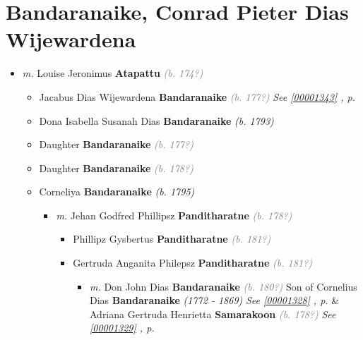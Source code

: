 \documentclass[10pt, openany]{book}
\begin{document}
\chapter{Bandaranaike, Conrad Pieter Dias Wijewardena}
\label{00001322}
\textcolor{slmaroon}{\textit{}}
\begin{itemize}
\item{\textit{m.} Louise Jeronimus \textbf{Atapattu} \textcolor{gray}{\textit{(b. 174?)}}   \label{couple:00001322:00001323} \begin{itemize}
\item{Jacabus Dias Wijewardena \textbf{Bandaranaike} \textcolor{gray}{\textit{(b. 177?)}} \textcolor{slteal}{\textit{See  \autoref{00001343} \textit{, p. \pageref{00001343} }}}}
\item{Dona Isabella Susanah Dias \textbf{Bandaranaike} \textcolor{slorange}{\textit{(b. 1793)}}
    }
\item{Daughter \textbf{Bandaranaike} \textcolor{gray}{\textit{(b. 177?)}}
 }
\item{Daughter \textbf{Bandaranaike} \textcolor{gray}{\textit{(b. 178?)}}
 }
\item{Corneliya \textbf{Bandaranaike} \textcolor{slorange}{\textit{(b. 1795)}}
\begin{itemize}
\item{\textit{m.} Jehan Godfred Phillipsz \textbf{Panditharatne} \textcolor{gray}{\textit{(b. 178?)}}   \label{couple:00002019:00002020} \begin{itemize}
\item{Phillipz Gysbertus \textbf{Panditharatne} \textcolor{gray}{\textit{(b. 181?)}}
  }
\item{Gertruda Anganita Philepsz \textbf{Panditharatne} \textcolor{gray}{\textit{(b. 181?)}}
\begin{itemize}
\item{\textit{m.} Don John Dias \textbf{Bandaranaike} \textcolor{gray}{\textit{(b. 180?)}} Son of  Cornelius Dias \textbf{Bandaranaike} \textcolor{slorange}{\textit{(1772 - 1869)}} \textcolor{slteal}{\textit{See  \autoref{00001328} \textit{, p. \pageref{00001328} }}}  \&  Adriana Gertruda Henrietta \textbf{Samarakoon} \textcolor{gray}{\textit{(b. 178?)}} \textcolor{slteal}{\textit{See  \autoref{00001329} \textit{, p. \pageref{00001329} }}}   \label{couple:00001333:00001334} \begin{itemize}

\end{itemize}}
\end{itemize}}
\end{itemize}}
\end{itemize}}
\end{itemize}}
\end{itemize}
\end{document}
